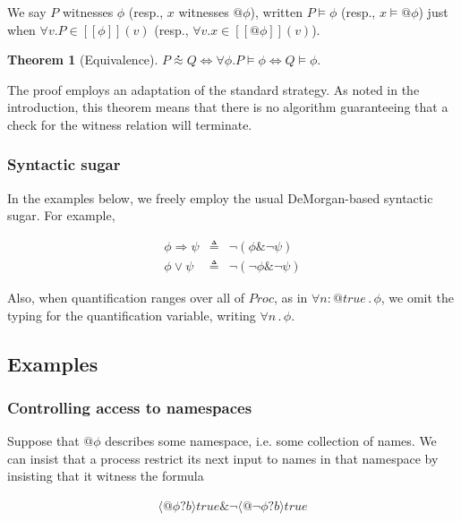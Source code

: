\documentclass[]{amsart}
\makeatletter
\newcommand{\ldb}{[\![}
\newcommand{\rdb}{]\!]}
\newcommand{\quotep}[1]{@#1}
\newcommand{\meaningof}[1]{\ldb #1 \rdb}
\newcommand{\Proc}{\mathbin{Proc}}
\newcommand{\wbbisim}{\stackrel{\centerdot}{\approx}} %
\newcommand{\ptrue}{\mathbin{true}}
\newcommand{\pprefix}[3]{\langle #1 ? #2 \rangle #3}
\newcommand{\pquant}[3]{\forall #1 \mathbin{:} #2 \mathbin{.} #3}
\newcommand{\pquantuntyped}[2]{\forall #1 \mathbin{.} #2}
\newcommand{\riff}{\Leftrightarrow}
\newtheorem{thm}{Theorem}[subsection]
\theoremstyle{definition}
\theoremstyle{remark}
\numberwithin{equation}{subsection}
\makeatother
\begin{document}
We say $P$ witnesses $\phi$ (resp., $x$ witnesses $\quotep{\phi}$),
written $P \models \phi$ (resp., $x \models \quotep{\phi}$) just when
$\forall v . P \in \meaningof{\phi}(v)$ (resp., $\forall v . x \in \meaningof{\quotep{\phi}}(v)$).

\begin{thm}[Equivalence]
	$P \wbbisim Q \riff \forall \phi . P \models \phi \riff Q \models \phi .$
\end{thm}

The proof employs an adaptation of the standard strategy. As noted in
the introduction, this theorem means that there is no algorithm
guaranteeing that a check for the witness relation will terminate.

\subsubsection{Syntactic sugar }

In the examples below, we freely employ the usual DeMorgan-based
syntactic sugar. For example,

\begin{eqnarray}
	\phi \Rightarrow \psi & \triangleq & \neg ( \phi \& \neg \psi ) \nonumber\\
	\phi \vee \psi & \triangleq & \neg ( \neg \phi \& \neg \psi ) \nonumber
\end{eqnarray}

Also, when quantification ranges over all of $\Proc$, as in
$\pquant{n}{\quotep{\ptrue}}{\phi}$, we omit the typing for the
quantification variable, writing $\pquantuntyped{n}{\phi}$.

\subsection{Examples}

\subsubsection{Controlling access to namespaces}

Suppose that $\quotep{\phi}$ describes some namespace, i.e. some
collection of names. We can insist that a process restrict its next
input to names in that namespace by insisting that it witness the formula

\begin{eqnarray}
  \pprefix{\quotep{\phi}}{b}{\ptrue} \& \neg \pprefix{\quotep{\neg \phi}}{b}{\ptrue} \nonumber
\end{eqnarray}
\end{document}
